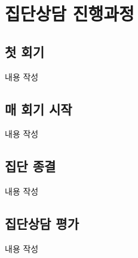\section{집단상담 진행과정}

\subsection{첫 회기}
내용 작성

\subsection{매 회기 시작}
내용 작성

\subsection{집단 종결}
내용 작성

\subsection{집단상담 평가}
내용 작성

